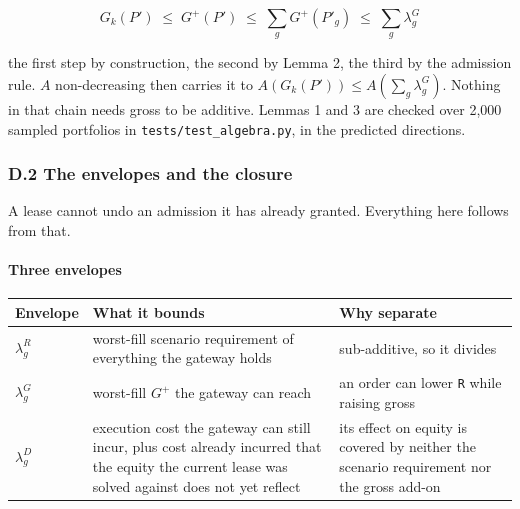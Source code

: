 \documentclass[10pt,a4paper]{article}
\newcounter{none}  %
\begin{document}
\[
G_k(P')\;\le\;G^{+}(P')\;\le\;\sum_g G^{+}(P'_g)\;\le\;\sum_g \lambda_g^{G}
\]

the first step by construction, the second by Lemma 2, the third by the admission
rule. \(A\) non-decreasing then carries it to
\(A(G_k(P'))\le A(\sum_g \lambda_g^{G})\). Nothing in that chain needs gross to be additive.
Lemmas 1 and 3 are checked over 2,000 sampled portfolios in
\texttt{tests/test\_algebra.py}, in the predicted directions.

\subsubsection{D.2 The envelopes and the closure}\label{d.2-the-envelopes-and-the-closure}

A lease cannot undo an admission it has already granted. Everything here follows
from that.

\paragraph{Three envelopes}\label{three-envelopes}

{\def\LTcaptype{none} %
\begin{longtable}[]{@{}
  >{\raggedright\arraybackslash}p{}
  >{\raggedright\arraybackslash}p{}
  >{\raggedright\arraybackslash}p{}@{}}
\toprule\noalign{}
\begin{minipage}[b]{\linewidth}\raggedright
Envelope
\end{minipage} & \begin{minipage}[b]{\linewidth}\raggedright
What it bounds
\end{minipage} & \begin{minipage}[b]{\linewidth}\raggedright
Why separate
\end{minipage} \\
\midrule\noalign{}
\endhead
\bottomrule\noalign{}
\endlastfoot
\(\lambda_g^{R}\) & worst-fill scenario requirement of everything the gateway holds & sub-additive, so it divides \\
\(\lambda_g^{G}\) & worst-fill \(G^{+}\) the gateway can reach & an order can lower \texttt{R} while raising gross \\
\(\lambda_g^{D}\) & execution cost the gateway can still incur, plus cost already incurred that the equity the current lease was solved against does not yet reflect & its effect on equity is covered by neither the scenario requirement nor the gross add-on \\
\end{longtable}
}
\end{document}
